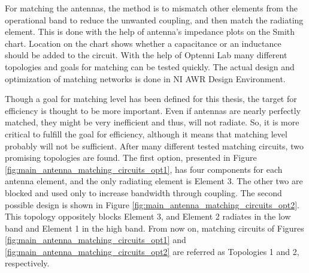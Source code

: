 For matching the antennas, the method is to mismatch other elements from the operational band to reduce the unwanted coupling, and then match the radiating element. This is done with the help of antenna's impedance plots on the Smith chart. Location on the chart shows whether a capacitance or an inductance should be added to the circuit. With the help of Optenni Lab many different topologies and goals for matching can be tested quickly. The actual design and optimization of matching networks is done in NI AWR Design Environment.

Though a goal for matching level has been defined for this thesis, the target for efficiency is thought to be more important. Even if antennas are nearly perfectly matched, they might be very inefficient and thus, will not radiate. So, it is more critical to fulfill the goal for efficiency, although it means that matching level probably will not be sufficient. After many different tested matching circuits, two promising topologies are found. The first option, presented in Figure \ref{fig:main_antenna_matching_circuits_opt1}, has four components for each antenna element, and the only radiating element is Element 3. The other two are blocked and used only to increase bandwidth through coupling. The second possible design is shown in Figure \ref{fig:main_antenna_matching_circuits_opt2}. This topology oppositely blocks Element 3, and Element 2 radiates in the low band and Element 1 in the high band. From now on, matching circuits of Figures \ref{fig:main_antenna_matching_circuits_opt1} and \ref{fig:main_antenna_matching_circuits_opt2} are referred as Topologies 1 and 2, respectively.

